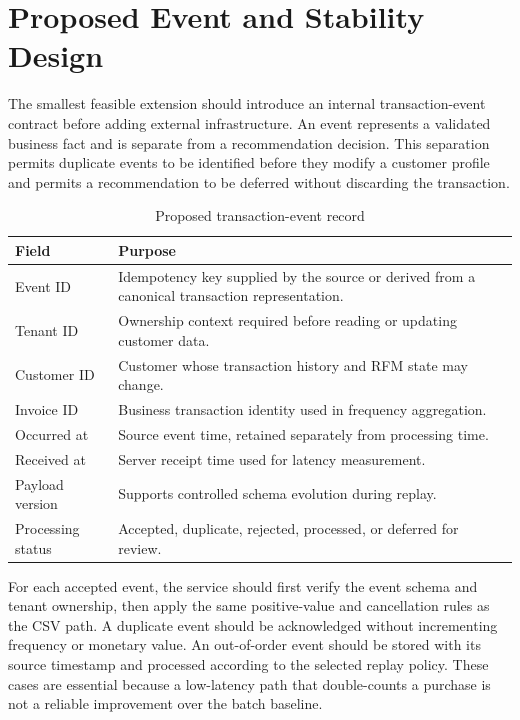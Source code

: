 \documentclass[conference]{IEEEtran}
\begin{document}
\section{Proposed Event and Stability Design}
The smallest feasible extension should introduce an internal transaction-event contract before adding external infrastructure. An event represents a validated business fact and is separate from a recommendation decision. This separation permits duplicate events to be identified before they modify a customer profile and permits a recommendation to be deferred without discarding the transaction.

\begin{table}[!t]
\caption{Proposed transaction-event record}
\label{tab:event-contract}
\centering
\small
\begin{tabular}{p{}p{}}
\toprule
Field & Purpose \\
\midrule
Event ID & Idempotency key supplied by the source or derived from a canonical transaction representation. \\
Tenant ID & Ownership context required before reading or updating customer data. \\
Customer ID & Customer whose transaction history and RFM state may change. \\
Invoice ID & Business transaction identity used in frequency aggregation. \\
Occurred at & Source event time, retained separately from processing time. \\
Received at & Server receipt time used for latency measurement. \\
Payload version & Supports controlled schema evolution during replay. \\
Processing status & Accepted, duplicate, rejected, processed, or deferred for review. \\
\bottomrule
\end{tabular}
\end{table}

For each accepted event, the service should first verify the event schema and tenant ownership, then apply the same positive-value and cancellation rules as the CSV path. A duplicate event should be acknowledged without incrementing frequency or monetary value. An out-of-order event should be stored with its source timestamp and processed according to the selected replay policy. These cases are essential because a low-latency path that double-counts a purchase is not a reliable improvement over the batch baseline.
\end{document}
